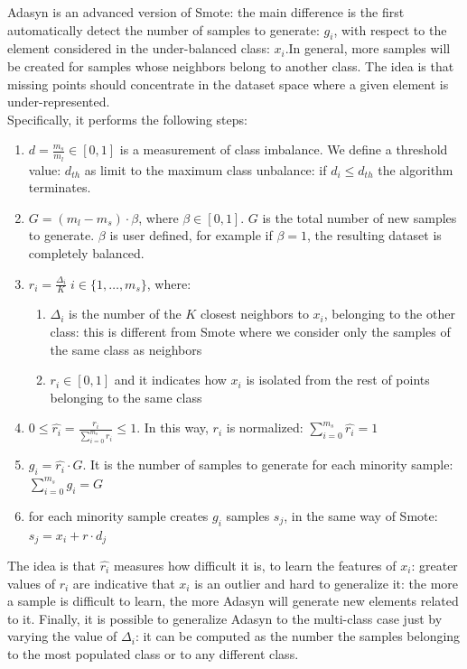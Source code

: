 \documentclass[LaM,binding=0.6cm]{sapthesis}
\begin{document}
Adasyn is an advanced version of Smote: the main difference is the first automatically detect the number of samples to generate: $g_i$, with respect to the element considered in the under-balanced class: $x_i$.In general, more samples will be created for samples whose neighbors belong to another class. The idea is that missing points should concentrate in the dataset space where a given element is under-represented.\\Specifically, it performs the following steps:
\begin{enumerate}
\item $d = \frac{m_s}{m_l} \in [0,1]$ is a measurement of class imbalance. We define a threshold value: $d_{th}$ as limit to the maximum class unbalance: if $d_i\le d_{th}$ the algorithm terminates.
\item $G=(m_l - m_s)\cdot \beta$, where $\beta \in [0,1]$. $G$ is the total number of new samples to generate. $\beta$ is user defined, for example if $\beta=1$, the resulting dataset is completely balanced.
\item $r_i = \frac{\Delta_i}{K} \; i \in \{1,\dots,m_{s}\}$, where:
\begin{enumerate}
\item  $\Delta_i$ is the number of the $K$ closest neighbors to $x_i$, belonging to the other class: this is different from Smote where we consider only the samples of the same class as neighbors
\item $r_i \in [0,1]$ and it indicates how $x_i$ is isolated from the rest of points belonging to the same class
\end{enumerate}
\item $0\leq \hat{r_i}=\frac{r_i}{\sum_{i=0}^{m_s}r_i }\leq 1$. In this way, $r_i$ is normalized: $\sum_{i=0}^{m_s}\hat{r_i} =1$
\item $g_i=\hat{r_i}\cdot G$. It is the number of samples to generate for each minority sample: $\sum_{i=0}^{m_s}g_i =G$ 
\item for each minority sample creates $g_i$ samples $s_j$, in the same way of Smote: $s_j = x_i+r\cdot d_j$
\end{enumerate}
The idea is that $\hat{r_i}$ measures how difficult it is, to learn the features of $x_i$: greater values of $r_i$ are indicative that $x_i$ is an outlier and hard to generalize it: the more a sample is difficult to learn, the more Adasyn will generate new elements related to it. Finally, it is possible to generalize Adasyn to the multi-class case just by varying the value of $\Delta_i$: it can be computed as the number the samples belonging to the most populated class or to any different class.
\end{document}
